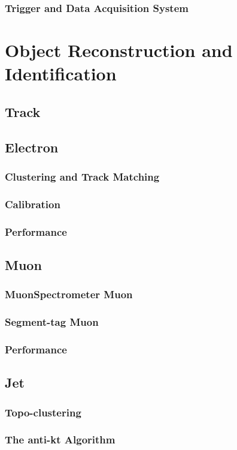 		\subsubsection{Trigger and Data Acquisition System}
%
\section{Object Reconstruction and Identification}
	\subsection{Track}
	\subsection{Electron}
		\subsubsection{Clustering and Track Matching}
		\subsubsection{Calibration}
		\subsubsection{Performance}
	\subsection{Muon}
		\subsubsection{MuonSpectrometer Muon}
		\subsubsection{Segment-tag Muon}
		\subsubsection{Performance}
	\subsection{Jet}
		\subsubsection{Topo-clustering}
		\subsubsection{The anti-kt Algorithm}
